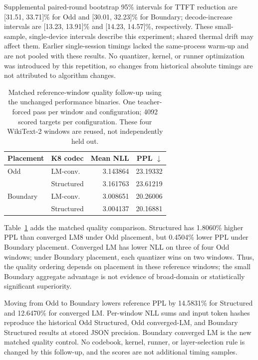 \documentclass[conference,a4paper,10pt]{IEEEtran}
\begin{document}
Supplemental paired-round bootstrap 95\% intervals for TTFT reduction are [31.51, 33.71]\% for Odd and [30.01, 32.23]\% for Boundary; decode-increase intervals are [13.23, 13.91]\% and [14.23, 14.57]\%, respectively. These small-sample, single-device intervals describe this experiment; shared thermal drift may affect them. Earlier single-session timings lacked the same-process warm-up and are not pooled with these results. No quantizer, kernel, or runner optimization was introduced by this repetition, so changes from historical absolute timings are not attributed to algorithm changes.

\begin{table}[t]
\caption{Matched reference-window quality follow-up using the unchanged performance binaries. One teacher-forced pass per window and configuration; 4092 scored targets per configuration. These four WikiText-2 windows are reused, not independently held out.}
\label{tab:lm-ppl}
\centering
\setlength{\tabcolsep}{4pt}
\begin{tabular}{@{}llrr@{}}
\toprule
Placement & K8 codec & Mean NLL & PPL $\downarrow$\\
\midrule
Odd & LM-conv. & 3.143864 & 23.19332\\
 & Structured & 3.161763 & 23.61219\\
\midrule
Boundary & LM-conv. & 3.008651 & 20.26006\\
 & Structured & 3.004137 & 20.16881\\
\bottomrule
\end{tabular}
\end{table}

Table~\ref{tab:lm-ppl} adds the matched quality comparison. Structured has 1.8060\% higher PPL than converged LM8 under Odd placement, but 0.4504\% lower PPL under Boundary placement. Converged LM has lower NLL on three of four Odd windows; under Boundary placement, each quantizer wins on two windows. Thus, the quality ordering depends on placement in these reference windows; the small Boundary aggregate advantage is not evidence of broad-domain or statistically significant superiority.

Moving from Odd to Boundary lowers reference PPL by 14.5831\% for Structured and 12.6470\% for converged LM. Per-window NLL sums and input token hashes reproduce the historical Odd Structured, Odd converged-LM, and Boundary Structured results at stored JSON precision. Boundary converged LM is the new matched quality control. No codebook, kernel, runner, or layer-selection rule is changed by this follow-up, and the scores are not additional timing samples.
\end{document}
